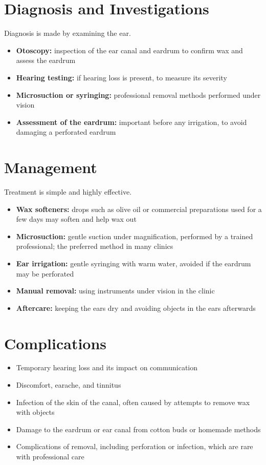 \section*{Diagnosis and Investigations}
Diagnosis is made by examining the ear.
\begin{itemize}
    \item \textbf{Otoscopy:} inspection of the ear canal and eardrum to confirm wax and assess the eardrum
    \item \textbf{Hearing testing:} if hearing loss is present, to measure its severity
    \item \textbf{Microsuction or syringing:} professional removal methods performed under vision
    \item \textbf{Assessment of the eardrum:} important before any irrigation, to avoid damaging a perforated eardrum
\end{itemize}

\section*{Management}
Treatment is simple and highly effective.
\begin{itemize}
    \item \textbf{Wax softeners:} drops such as olive oil or commercial preparations used for a few days may soften and help wax out
    \item \textbf{Microsuction:} gentle suction under magnification, performed by a trained professional; the preferred method in many clinics
    \item \textbf{Ear irrigation:} gentle syringing with warm water, avoided if the eardrum may be perforated
    \item \textbf{Manual removal:} using instruments under vision in the clinic
    \item \textbf{Aftercare:} keeping the ears dry and avoiding objects in the ears afterwards
\end{itemize}

\section*{Complications}
\begin{itemize}
    \item Temporary hearing loss and its impact on communication
    \item Discomfort, earache, and tinnitus
    \item Infection of the skin of the canal, often caused by attempts to remove wax with objects
    \item Damage to the eardrum or ear canal from cotton buds or homemade methods
    \item Complications of removal, including perforation or infection, which are rare with professional care
\end{itemize}


